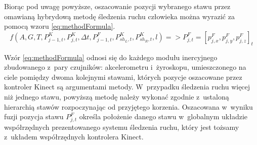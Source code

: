 Biorąc pod uwagę powyższe, oszacowanie pozycji wybranego stawu przez omawianą hybrydową metodę śledzenia ruchu człowieka można wyrazić za pomocą wzoru \ref{eq:methodFormula}.
\begin{equation}
	f(A,G,T,P_{j-1,t}^K,P_{j,t}^K,\Delta t, P^F_{j-1,t}, P^K_{sh_L,t},P^K_{sh_R,t},l) => P^F_{j,t} = [p_{j,x}^F,p_{j,y}^F,p_{j,z}^F]_t
	\label{eq:methodFormula}
\end{equation}


Wzór \ref{eq:methodFormula} odnosi się do każdego modułu inercyjnego zbudowanego z~pary czujników: akcelerometru i~żyroskopu, umieszczonego na ciele pomiędzy dwoma kolejnymi stawami, których pozycje oszacowane przez kontroler Kinect są argumentami metody. W~przypadku śledzenia ruchu więcej niż jednego stawu, powyższą metodę należy wykonać zgodnie z~ustaloną hierarchią stawów rozpoczynając od przyjętego korzenia. Oszacowana w~wyniku fuzji pozycja stawu $P^F_{j,t}$ określa położenie danego stawu w~globalnym układzie współrzędnych prezentowanego systemu śledzenia ruchu, który jest tożsamy z~układem współrzędnych kontrolera Kinect.

